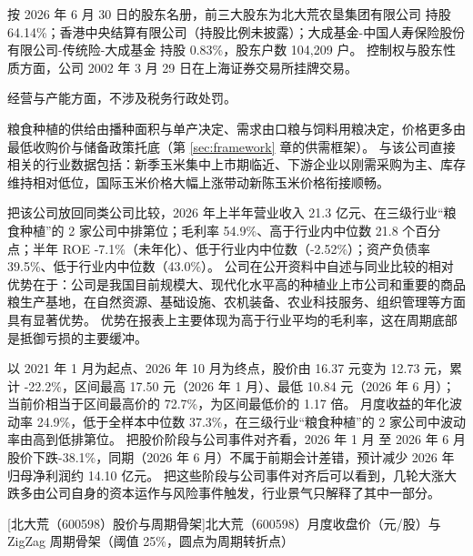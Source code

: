  按 2026 年 6 月 30 日的股东名册，前三大股东为北大荒农垦集团有限公司 持股 64.14\%；香港中央结算有限公司（持股比例未披露）；大成基金-中国人寿保险股份有限公司-传统险-大成基金 持股 0.83\%，股东户数 104,209 户。 控制权与股东性质方面，公司 2002 年 3 月 29 日在上海证券交易所挂牌交易。

 经营与产能方面，不涉及税务行政处罚。

 粮食种植的供给由播种面积与单产决定、需求由口粮与饲料用粮决定，价格更多由最低收购价与储备政策托底（第 \ref{sec:framework} 章的供需框架）。 与该公司直接相关的行业数据包括：新季玉米集中上市期临近、下游企业以刚需采购为主、库存维持相对低位，国际玉米价格大幅上涨带动新陈玉米价格衔接顺畅。

 把该公司放回同类公司比较，2026 年上半年营业收入 21.3 亿元、在三级行业“粮食种植”的 2 家公司中排第位；毛利率 54.9\%、高于行业内中位数 21.8 个百分点；半年 ROE -7.1\%（未年化）、低于行业内中位数（-2.52\%）；资产负债率 39.5\%、低于行业内中位数（43.0\%）。 公司在公开资料中自述与同业比较的相对优势在于：公司是我国目前规模大、现代化水平高的种植业上市公司和重要的商品粮生产基地，在自然资源、基础设施、农机装备、农业科技服务、组织管理等方面具有显著优势。 优势在报表上主要体现为高于行业平均的毛利率，这在周期底部是抵御亏损的主要缓冲。

 以 2021 年 1 月为起点、2026 年 10 月为终点，股价由 16.37 元变为 12.73 元，累计 -22.2\%，区间最高 17.50 元（2026 年 1 月）、最低 10.84 元（2026 年 6 月）；当前价相当于区间最高价的 72.7\%，为区间最低价的 1.17 倍。 月度收益的年化波动率 24.9\%，低于全样本中位数 37.3\%，在三级行业“粮食种植”的 2 家公司中波动率由高到低排第位。 把股价阶段与公司事件对齐看，2026 年 1 月 至 2026 年 6 月股价下跌-38.1\%，同期（2026 年 6 月）不属于前期会计差错，预计减少 2026 年归母净利润约 14.10 亿元。 把这些阶段与公司事件对齐后可以看到，几轮大涨大跌多由公司自身的资本运作与风险事件触发，行业景气只解释了其中一部分。

\begin{center}
\begin{minipage}{\textwidth}\centering
{}

[北大荒（600598）股价与周期骨架]{北大荒（600598）月度收盘价（元/股）与 ZigZag 周期骨架（阈值 25\%，圆点为周期转折点）}
\end{minipage}
\end{center}

